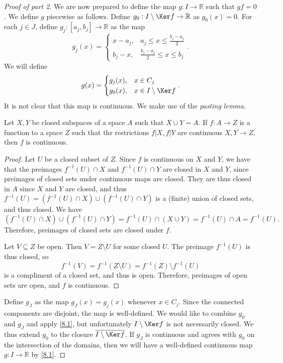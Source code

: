\documentclass[11pt, letterpaper]{article}
\theoremstyle{plain}
\begin{document}
\begin{proof}[Proof of part 2]
	We are now prepared to define the map $g : I \to \mathbb{R} $ such that $gf=0$. We define $g$ piecewise as follows. Define $g_0 : I\setminus \Ker f \to \mathbb{R} $ as $g_0(x)=0$. For each $j\in J$, define $g_j : [a_j,b_j] \to \mathbb{R} $ as the map
	\[
		g_j(x)=
		\begin{cases}
		x-a_j,&\displaystyle{a_j \leq x\leq \frac{b_j-a_j}{2}} \\[10pt]
		b_j-x,&\displaystyle{\frac{b_j-a_j}{2} \leq x\leq b_j}
		\end{cases}
	.\]
	We will define
	\[
		g(x)=
		\begin{cases}
			g_j(x),&x\in C_j\\
			g_0(x),&x\in I\setminus \Ker f
		\end{cases}
	.\]
	It is not clear that this map is continuous. We make use of the \emph{pasting lemma}.

	\begin{lemma}\label{8.1}
		Let $X,Y$ be closed subspaces of a space $A$ such that $X \cup Y=A$. If $f : A \to Z$ is a function to a space $Z$ such that thr restrictions $f|X,f|Y$ are continuous $X,Y\to Z$, then $f$ is continuous.
	\end{lemma}
	\begin{proof}
		Let $U$ be a closed subset of $Z$. Since $f$ is continuous on $X$ and $Y$, we have that the preimages $f^{-1} (U) \cap X$ and $f^{-1} (U) \cap Y$ are closed in $X$ and $Y$, since preimages of closed sets under continuous maps are closed. They are thus closed in $A$ since $X$ and $Y$ are closed, and thus $f^{-1} (U) = (f^{-1} (U) \cap X)\cup (f^{-1} (U) \cap Y)$ is a (finite) union of closed sets, and thus closed. We have
		\[
			\left( f^{-1} (U)\cap X \right) \cup \left( f^{-1} (U)\cap Y \right) =f^{-1} (U) \cap (X \cup Y)=f^{-1} (U) \cap A=f^{-1} (U)
		.\]
		Therefore, preimages of closed sets are closed under $f$.

		Let $V\subseteq Z$ be open. Then $V=Z \setminus U$ for some closed $U$. The preimage $f^{-1} (U)$ is thus closed, so
		\[
			f^{-1} (V)=f^{-1} (Z\setminus U)=f^{-1} (Z)\setminus f^{-1} (U)
		\]
		is a compliment of a closed set, and thus is open. Therefore, preimages of open sets are open, and $f$ is continuous.
	\end{proof}

	Define $g_J$ as the map $g_J(x)=g_j(x)$ whenever $x\in C_j$. Since the connected components are disjoint, the map is well-defined. We would like to combine $g_0$ and $g_J$ and apply \cref{8.1}, but unfortunately $I\setminus \Ker f$ is not necessarily closed. We thus extend $g_0$ to the closure $\overline{I\setminus \Ker f}$. If $g_J$ is continuous and agrees with $g_0$ on the intersection of the domains, then we will have a well-defined continuous map $g : I \to \mathbb{R} $ by \cref{8.1}.


\end{proof}
\end{document}
